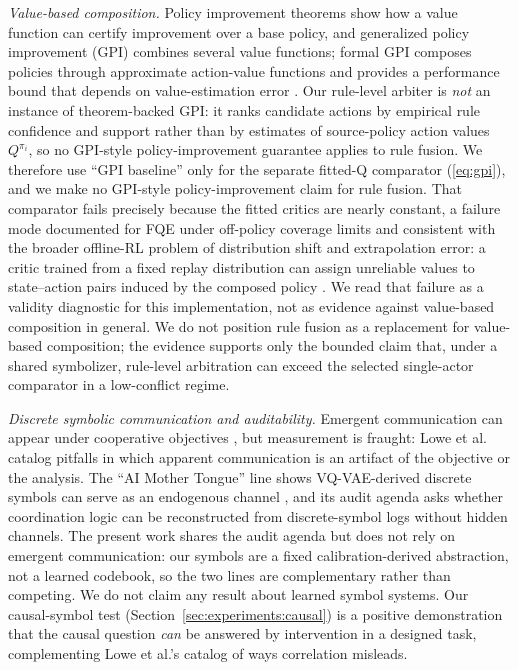\documentclass[11pt]{article}
\begin{document}
\emph{Value-based composition.} Policy improvement theorems \cite{sutton2018reinforcement} show how
a value function can certify improvement over a base policy, and generalized policy improvement
(GPI) combines several value functions; formal GPI composes policies through approximate action-value
functions and provides a performance bound that depends on value-estimation error
\cite{barreto2017successor}. Our rule-level arbiter is \emph{not} an instance of theorem-backed GPI: it
ranks candidate actions by empirical rule confidence and support rather than by estimates of
source-policy action values $Q^{\pi_i}$, so no GPI-style policy-improvement guarantee applies to rule
fusion. We therefore use ``GPI baseline'' only for the separate fitted-Q comparator (\ref{eq:gpi}),
and we make no GPI-style policy-improvement claim for rule fusion. That comparator fails precisely
because the fitted critics are nearly constant, a failure mode documented for FQE under off-policy
coverage limits \cite{le2019batch,voloshin2021empirical} and consistent with the broader offline-RL
problem of distribution shift and extrapolation error: a critic trained from a fixed replay
distribution can assign unreliable values to state--action pairs induced by the composed policy
\cite{fujimoto2019offpolicy,kumar2020cql}. We read that failure as a validity diagnostic for this
implementation, not as evidence against value-based composition in general. We do not position rule
fusion as a replacement for value-based composition; the evidence supports only the bounded claim
that, under a shared symbolizer, rule-level arbitration can exceed the selected single-actor
comparator in a low-conflict regime.

\emph{Discrete symbolic communication and auditability.} Emergent communication can
appear under cooperative objectives \cite{foerster2016,havrylov2017}, but measurement is fraught:
Lowe et al.\ \cite{lowe2019} catalog pitfalls in which apparent communication is an artifact of the
objective or the analysis. The ``AI Mother Tongue'' line shows VQ-VAE-derived discrete symbols can
serve as an endogenous channel \cite{liu2025aim}, and its audit agenda asks whether coordination logic
can be reconstructed from discrete-symbol logs without hidden channels. The present work shares the
audit agenda but does not rely on emergent communication: our symbols are a fixed calibration-derived
abstraction, not a learned codebook, so the two lines are complementary rather than competing. We do
not claim any result about learned symbol systems. Our causal-symbol test
(Section~\ref{sec:experiments:causal}) is a positive demonstration that the causal question \emph{can}
be answered by intervention in a designed task, complementing Lowe et al.'s catalog of ways correlation
misleads.
\end{document}
